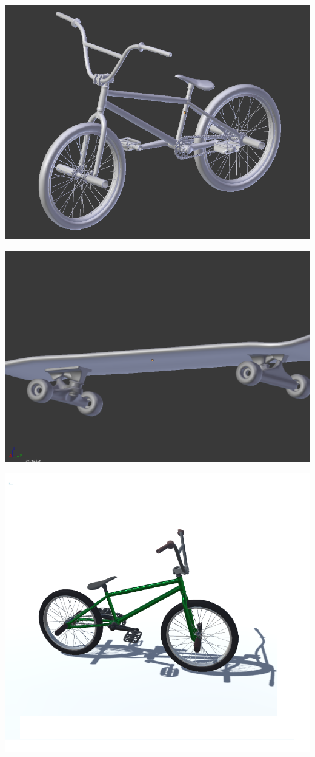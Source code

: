 \documentclass{article}
\begin{document}
  \includegraphics[width=\textwidth]{12.png}

  \includegraphics[width=\textwidth]{13.png}
  
  \includegraphics[width=\textwidth]{15.png}
\end{document}
